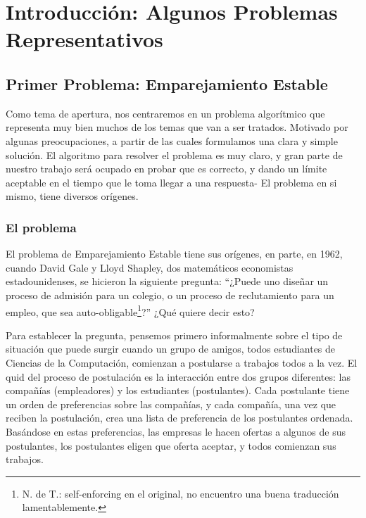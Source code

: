 \documentclass[a4paper, 12pt]{book}
\theoremstyle{dotless}
\begin{document}
\chapter{Introducción: Algunos Problemas Representativos}
\label{cap:intro}

\section{Primer Problema: Emparejamiento Estable}

Como tema de apertura, nos centraremos en un problema algorítmico que representa muy bien muchos de los temas que van a ser tratados. Motivado por algunas preocupaciones, a partir de las cuales formulamos una clara y simple solución. El algoritmo para resolver el problema es muy claro,  y gran parte de nuestro trabajo será ocupado en probar que es correcto, y dando un límite aceptable en el tiempo que le toma llegar a una respuesta- El problema en si mismo, tiene diversos orígenes.

\subsection*{El problema}

El problema de Emparejamiento Estable tiene sus orígenes, en parte, en 1962, cuando David Gale y Lloyd Shapley, dos matemáticos economistas estadounidenses, se hicieron la siguiente pregunta: ``¿Puede uno diseñar un proceso de admisión para un colegio, o un proceso de reclutamiento para un empleo, que sea auto-obligable\footnote{N. de T.: self-enforcing en el original, no encuentro una buena traducción lamentablemente.}?''  ¿Qué quiere decir esto?

Para establecer la pregunta, pensemos primero informalmente sobre el tipo de situación que puede surgir cuando un grupo de amigos, todos estudiantes de Ciencias de la Computación, comienzan a postularse a trabajos todos a la vez. El quid del proceso de postulación es la interacción entre dos grupos diferentes: las compañías (empleadores) y los estudiantes (postulantes). Cada postulante tiene un orden de preferencias sobre las compañías, y cada compañía, una vez que reciben la postulación, crea una lista de preferencia de los postulantes ordenada. Basándose en estas preferencias, las empresas le hacen ofertas a algunos de sus postulantes, los postulantes eligen que oferta aceptar, y todos comienzan sus trabajos.  
\end{document}
